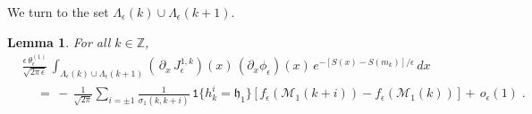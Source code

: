 \documentclass[reqno]{amsart}
\theoremstyle{plain}
\newtheorem{lemma}[theorem]{Lemma}
\theoremstyle{definition}
\newcommand{\mf}[1]{{\mathfrak #1}}
\newcommand{\bb}[1]{{\mathbb #1}}
\newcommand{\ms}[1]{{\mathscr #1}}
\newcommand{\mtt}[1]{{\mathtt #1}}
\newcounter{as}[section]
\newcommand{\<}{\langle}
\renewcommand{\>}{\rangle}
\begin{document}
We turn to the set $\Lambda_\epsilon (k) \cup \Lambda_\epsilon
(k+1)$. 

\begin{lemma}
\label{as1}
For all $k\in \bb Z$, 
\begin{equation*}
\begin{aligned}
& \frac{\epsilon\, \theta_{\epsilon}^{(1)}}{\sqrt{2\pi\,\epsilon}}\,
\int_{\Lambda_{\epsilon}(k) \cup \Lambda_{\epsilon}(k+1)} (\, \partial_x \,
J_{\epsilon}^{1,k} )(x) \, (\partial_x \phi_{\epsilon}) (x) \,
e^{-[S(x)-S(m_k)]/\epsilon} \, dx
\\
&\quad \,=\, -\,  \frac{1}{\sqrt{2\pi}} \sum_{i=\pm 1} 
\frac{1}{\sigma_1(k,k+i)}\, \mtt 1 \{h^i_k = \mf h_1\}
\, \big[\, f_{\epsilon}(\ms M_1(k+i))-f_{\epsilon}(\ms M_1 (k))\,\big]
\,+\, o_\epsilon(1)  \;.
\end{aligned}
\end{equation*}
\end{lemma}
\end{document}
